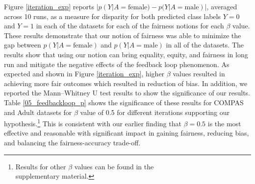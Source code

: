 Figure \ref{iteration_exp} reports $|p(Y|A=\text{female})-p(Y|A=\text{male})|$, averaged across 10 runs, as a measure for disparity for both predicted class labels $Y=0$ and $Y=1$ in each of the datasets for each of the fairness notions for each $\beta$ value. These results demonstrate that our notion of fairness was able to minimize the gap between $p(Y|A=\text{female})$ and $p(Y|A=\text{male})$ in all of the datasets. The results show that using our notion can bring equality, equity, and fairness in long run and mitigate the negative effects of the feedback loop phenomenon. As expected and shown in Figure \ref{iteration_exp}, higher $\beta$ values resulted in achieving more fair outcomes which resulted in reduction of bias. In addition, we reported the Mann–Whitney U test results to show the significance of our results. Table \ref{05_feedbackloop_p} shows the significance of these results for COMPAS and Adult datasets for $\beta$ value of 0.5 for different iterations supporting our hypothesis.\footnote{Results for other $\beta$ values  can be found in the \\ supplementary material.} This is consistent with our earlier finding that $\beta = 0.5$ is the most effective and reasonable with significant impact in gaining fairness, reducing bias, and balancing the fairness-accuracy trade-off. 



